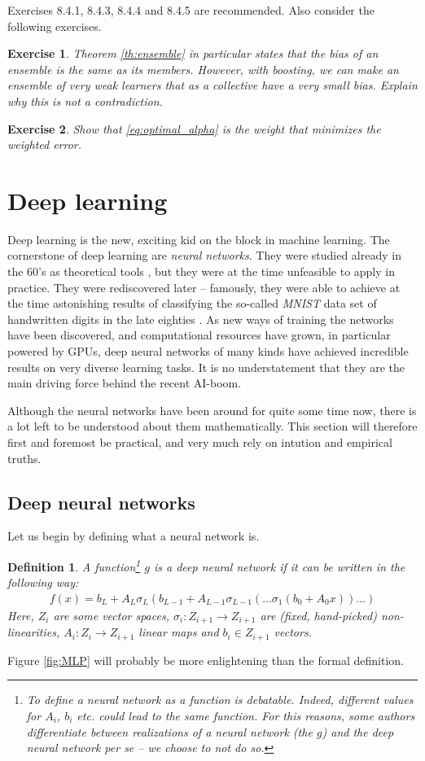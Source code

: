 \documentclass{article}
\newtheorem{defi}{Definition}
\newtheorem{exercise}{Exercise}
\begin{document}
Exercises 8.4.1, 8.4.3, 8.4.4 and 8.4.5 are recommended. Also consider the following exercises.

\begin{exercise}
    Theorem \ref{th:ensemble} in particular states that the bias of an ensemble is the same as its members. However, with boosting, we can make an ensemble of very weak learners that as a collective have a very small bias. Explain why this is not a contradiction.  
\end{exercise}

\begin{exercise}
    Show that \eqref{eq:optimal_alpha} is the weight that minimizes the weighted error.
\end{exercise}

\section{Deep learning}
Deep learning is the new, exciting kid on the block in machine learning. The cornerstone of deep learning are \emph{neural networks}. They were studied already in the 60's as theoretical tools \cite{widrow199030}, but they were at the time unfeasible to apply in practice. They were rediscovered later  -- famously, they were able to achieve at the time astonishing results of classifying the so-called \emph{MNIST} data set of handwritten digits in the late eighties \cite{lecun1989handwritten}. As new ways of training the networks have been discovered, and computational resources have grown, in particular powered by GPUs, deep neural networks of many kinds have achieved incredible results on very diverse learning tasks. It is no understatement that they are the main driving force behind the recent AI-boom.

Although the neural networks have been around for quite some time now, there is a lot left to be understood about them mathematically. This section will therefore first and foremost be practical, and very much rely on intution and empirical truths.


\subsection{Deep neural networks}
Let us begin by defining what a neural network is.
\begin{defi} A function\footnote{To define a neural network as a function is debatable. Indeed, different values for $A_i$, $b_i$ etc. could lead to the same function. For this reasons, some authors differentiate between \emph{realizations} of a neural network (the $g$) and the deep neural network per se -- we choose to not do so.} $g$ is a \emph{deep neural network} if it can be written in the following way:
\begin{align*}
    f(x) = b_{L}+A_L\sigma_L(b_{L-1}+ A_{L-1}\sigma_{L-1}(\dots \sigma_1(b_0+A_0x))\dots)
\end{align*}
Here,  $Z_i$ are some vector spaces, $\sigma_i: Z_{i+1} \to Z_{i+1}$ are (fixed, hand-picked) non-linearities, $A_i: Z_i \to Z_{i+1}$ linear maps and $b_i \in Z_{i+1}$ vectors.
\end{defi}
Figure \ref{fig:MLP} will probably be more enlightening than the formal definition. 
\end{document}
